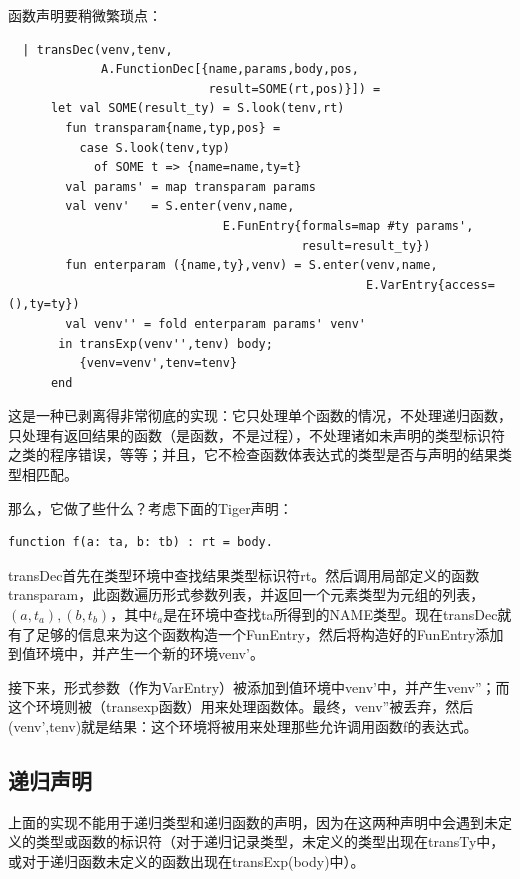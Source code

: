 \documentclass[cn,11pt,chinese]{elegantbook}
\begin{document}
函数声明要稍微繁琐点：

\begin{lstlisting}
  | transDec(venv,tenv,
             A.FunctionDec[{name,params,body,pos,
                            result=SOME(rt,pos)}]) =
      let val SOME(result_ty) = S.look(tenv,rt)
        fun transparam{name,typ,pos} =
          case S.look(tenv,typ)
            of SOME t => {name=name,ty=t}
        val params' = map transparam params
        val venv'   = S.enter(venv,name,
                              E.FunEntry{formals=map #ty params',
                                         result=result_ty})
        fun enterparam ({name,ty},venv) = S.enter(venv,name,
                                                  E.VarEntry{access=(),ty=ty})
        val venv'' = fold enterparam params' venv'
       in transExp(venv'',tenv) body;
          {venv=venv',tenv=tenv}
      end
\end{lstlisting}

这是一种已剥离得非常彻底的实现：它只处理单个函数的情况，不处理递归函数，只处理有返回结果的函数（是函数，不是过程），不处理诸如未声明的类型标识符之类的程序错误，等等；并且，它不检查函数体表达式的类型是否与声明的结果类型相匹配。

那么，它做了些什么？考虑下面的Tiger声明：

\begin{lstlisting}
function f(a: ta, b: tb) : rt = body.
\end{lstlisting}

transDec首先在类型环境中查找结果类型标识符rt。然后调用局部定义的函数transparam，此函数遍历形式参数列表，并返回一个元素类型为元组的列表，$(a,t_a),(b,t_b)$，其中$t_a$是在环境中查找ta所得到的NAME类型。现在transDec就有了足够的信息来为这个函数构造一个FunEntry，然后将构造好的FunEntry添加到值环境中，并产生一个新的环境venv'。

接下来，形式参数（作为VarEntry）被添加到值环境中venv'中，并产生venv''；而这个环境则被（transexp函数）用来处理函数体。最终，venv''被丢弃，然后(venv',tenv)就是结果：这个环境将被用来处理那些允许调用函数f的表达式。

\subsection{递归声明}

上面的实现不能用于递归类型和递归函数的声明，因为在这两种声明中会遇到未定义的类型或函数的标识符（对于递归记录类型，未定义的类型出现在transTy中，或对于递归函数未定义的函数出现在transExp(body)中）。
\end{document}
